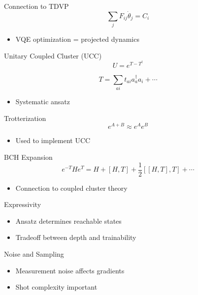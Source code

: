 \documentclass{beamer}
\begin{document}
\begin{frame}{Connection to TDVP}
\[
\sum_j F_{ij} \dot{\theta}_j = C_i
\]

\begin{itemize}
\item VQE optimization = projected dynamics
\end{itemize}
\end{frame}

\begin{frame}{Unitary Coupled Cluster (UCC)}
\[
U = e^{T - T^\dagger}
\]

\[
T = \sum_{ai} t_{ai} a_a^\dagger a_i + \cdots
\]

\begin{itemize}
\item Systematic ansatz
\end{itemize}
\end{frame}

\begin{frame}{Trotterization}
\[
e^{A+B} \approx e^A e^B
\]

\begin{itemize}
\item Used to implement UCC
\end{itemize}
\end{frame}

\begin{frame}{BCH Expansion}
\[
e^{-T}He^T = H + [H,T] + \frac{1}{2}[[H,T],T] + \cdots
\]

\begin{itemize}
\item Connection to coupled cluster theory
\end{itemize}
\end{frame}

\begin{frame}{Expressivity}
\begin{itemize}
\item Ansatz determines reachable states
\item Tradeoff between depth and trainability
\end{itemize}
\end{frame}

\begin{frame}{Noise and Sampling}
\begin{itemize}
\item Measurement noise affects gradients
\item Shot complexity important
\end{itemize}
\end{frame}
\end{document}
